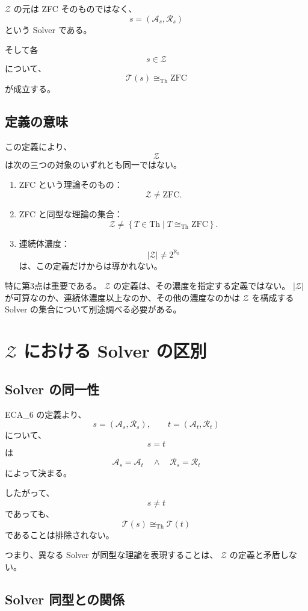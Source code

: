 \documentclass[a4paper,11pt]{jsarticle}
\newcommand{\Th}{\mathrm{Th}}
\begin{document}
$\mathcal{Z}$ の元は ZFC そのものではなく、
\[
s=(\mathcal{A}_s,\mathcal{R}_s)
\]
という Solver である。

そして各
\[
s\in\mathcal{Z}
\]
について、
\[
\mathcal{T}(s)\cong_{\mathrm{Th}}\mathrm{ZFC}
\]
が成立する。

\subsection{定義の意味}

この定義により、
\[
\mathcal{Z}
\]
は次の三つの対象のいずれとも同一ではない。

\begin{enumerate}
\item ZFC という理論そのもの：
\[
\mathcal{Z}\neq\mathrm{ZFC}.
\]

\item ZFC と同型な理論の集合：
\[
\mathcal{Z}
\neq
\left\{
T\in\Th\mid T\cong_{\mathrm{Th}}\mathrm{ZFC}
\right\}.
\]

\item 連続体濃度：
\[
|\mathcal{Z}|
\neq
2^{\aleph_0}
\]
は、この定義だけからは導かれない。
\end{enumerate}

特に第3点は重要である。
$\mathcal{Z}$ の定義は、その濃度を指定する定義ではない。
$|\mathcal{Z}|$ が可算なのか、連続体濃度以上なのか、その他の濃度なのかは $\mathcal{Z}$ を構成する Solver の集合について別途調べる必要がある。

\section{$\mathcal{Z}$ における Solver の区別}

\subsection{Solver の同一性}

ECA_6 の定義より、
\[
s=(\mathcal{A}_s,\mathcal{R}_s),
\qquad
t=(\mathcal{A}_t,\mathcal{R}_t)
\]
について、
\[
s=t
\]
は
\[
\mathcal{A}_s=\mathcal{A}_t
\quad\land\quad
\mathcal{R}_s=\mathcal{R}_t
\]
によって決まる。

したがって、
\[
s\neq t
\]
であっても、
\[
\mathcal{T}(s)\cong_{\mathrm{Th}}\mathcal{T}(t)
\]
であることは排除されない。

つまり、異なる Solver が同型な理論を表現することは、
$\mathcal{Z}$ の定義と矛盾しない。

\subsection{Solver 同型との関係}
\end{document}
